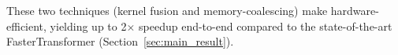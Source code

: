 These two techniques (kernel fusion and memory-coalescing) make \name{}
hardware-efficient, yielding up to 2$\times$ speedup end-to-end compared to the state-of-the-art FasterTransformer (Section~\ref{sec:main_result}).






 






